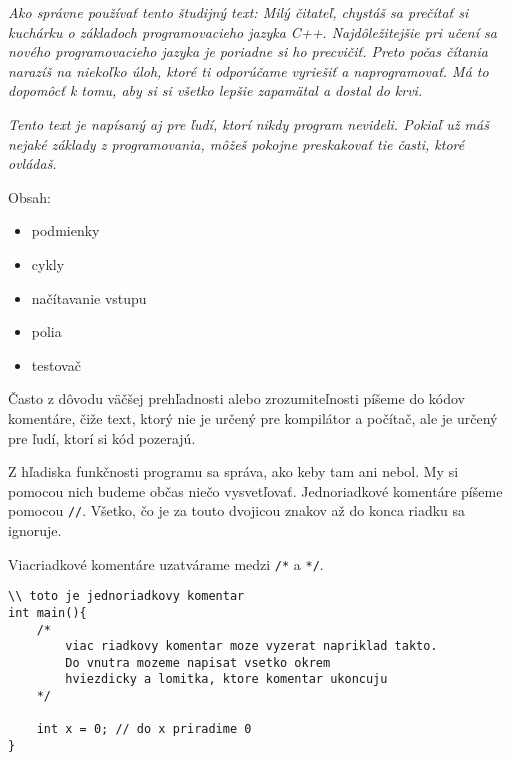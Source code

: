 




\textit{Ako správne používať tento študijný text: Milý čitateľ, chystáš sa
prečítať si kuchárku o základoch programovacieho jazyka C++. Najdôležitejšie
pri učení sa nového programovacieho jazyka je poriadne si ho precvičiť. Preto
počas čítania narazíš na niekoľko úloh, ktoré ti odporúčame vyriešiť a
naprogramovať.  Má to dopomôcť k tomu, aby si si všetko lepšie zapamätal a dostal
do krvi.}

\textit{Tento text je napísaný aj pre ľudí, ktorí nikdy program nevideli. Pokiaľ
už máš nejaké základy z programovania, môžeš pokojne preskakovať tie časti,
ktoré ovládaš.}

Obsah:
\begin{itemize}
    \item podmienky
    \item cykly 
    \item načítavanie vstupu
    \item polia
    \item testovač
\end{itemize}

\medskip


Často z dôvodu väčšej prehľadnosti alebo zrozumiteľnosti píšeme do kódov komentáre,  
čiže text, ktorý nie je určený pre kompilátor a počítač, ale je určený pre ľudí,
ktorí si kód pozerajú. 

Z hľadiska funkčnosti programu sa správa, ako keby tam ani nebol.
My si pomocou nich budeme občas niečo vysvetľovať. 
Jednoriadkové komentáre píšeme pomocou \verb!//!. Všetko, čo je za touto dvojicou
znakov až do konca riadku sa ignoruje.

Viacriadkové komentáre uzatvárame medzi \verb!/*! a \verb!*/!.

\begin{lstlisting}
\\ toto je jednoriadkovy komentar
int main(){
    /*
        viac riadkovy komentar moze vyzerat napriklad takto.
        Do vnutra mozeme napisat vsetko okrem
        hviezdicky a lomitka, ktore komentar ukoncuju
    */
    
    int x = 0; // do x priradime 0
}
\end{lstlisting}


